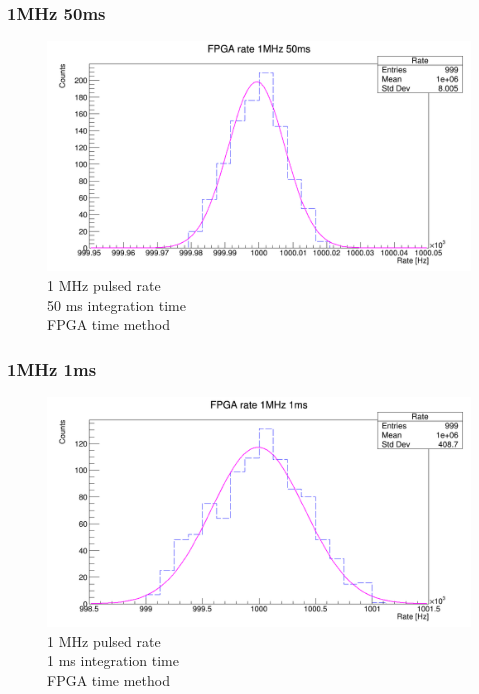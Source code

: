 \subsubsection{1MHz 50ms}
\begin{figure}[H]
	\centering
	\includegraphics[width=0.95\linewidth]{IMG/ch5/RateMeasures/FPGA-time-rate-1MHz-50ms}
	\caption{1 MHz pulsed rate\\50 ms integration time\\FPGA time method}
	\label{fig:FPGA-time-rate-1MHz-50ms}
\end{figure}


\subsubsection{1MHz 1ms}
\begin{figure}[H]
	\centering
	\includegraphics[width=0.95\linewidth]{IMG/ch5/RateMeasures/FPGA-time-rate-1MHz-1ms}
	\caption{1 MHz pulsed rate\\1 ms integration time\\FPGA time method}
	\label{fig:FPGA-time-rate-1MHz-1ms}
\end{figure}











